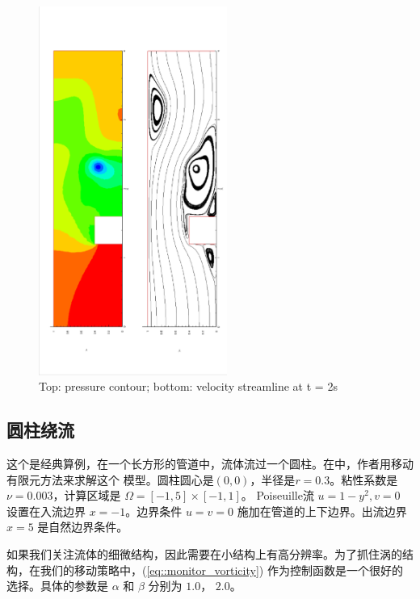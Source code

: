       \begin{figure}[!htbp]
        \centering
        \includegraphics[width = 0.55\textwidth, angle = -90]{picture/first/step_flow_data/contour_streamline_t_2s.eps}
        \caption{\small Top: pressure contour; bottom: velocity streamline
          at t = 2s}
        \label{fig::step_flow_contour_streamline_2s}
      \end{figure}

   \subsection{圆柱绕流}

      这个是经典算例，在一个长方形的管道中，流体流过一个圆柱。在\cite{cao1999anr}中，作者用移动有限元方法来求解这个
      模型。圆柱圆心是$(0, 0)$，半径是$r = 0.3$。粘性系数是 $\nu = 0.003$，计算区域是 $\Omega = [-1, 5] \times [-1, 1]$。
      Poiseuille流 $u = 1 - y^2, v = 0$ 设置在入流边界 $x = -1$。边界条件 $u = v = 0$ 施加在管道的上下边界。出流边界 $x = 5$
      是自然边界条件。

      如果我们关注流体的细微结构，因此需要在小结构上有高分辨率。为了抓住涡的结构，在我们的移动策略中，(\ref{eq::monitor_vorticity})
      作为控制函数是一个很好的选择。具体的参数是 $\alpha$ 和 $\beta$ 分别为 $1.0$， $2.0$。

